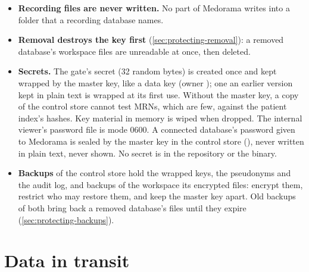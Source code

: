 \begin{itemize}
  of their persons. Their encryption at rest is their owners' (a db-builder database may be
  written encrypted, ).
\item \textbf{Recording files are never written.} No part of Medorama writes into a folder that a
  recording database names.
\item \textbf{Removal destroys the key first} (\cref{sec:protecting-removal}): a removed database's
  workspace files are unreadable at once, then deleted.
\item \textbf{Secrets.} The gate's secret (32 random bytes) is created once and kept wrapped by
  the master key, like a data key (owner ); one an earlier version kept in plain text
  is wrapped at its first use. Without the master key, a copy of the control store cannot test
  MRNs, which are few, against the patient index's hashes. Key material in memory is wiped when
  dropped. The internal viewer's password file is mode 0600. A connected database's password
  given to Medorama is sealed by the master key in the control store (),
  never written in plain text, never shown. No secret is in the repository or the binary.
\item \textbf{Backups} of the control store hold the wrapped keys, the pseudonyms and the audit
  log, and backups of the workspace its encrypted files: encrypt them, restrict who may restore
  them, and keep the master key apart. Old backups of both bring back a removed database's files
  until they expire (\cref{sec:protecting-backups}).
\end{itemize}

\section{Data in transit}
\label{sec:security-transit}

